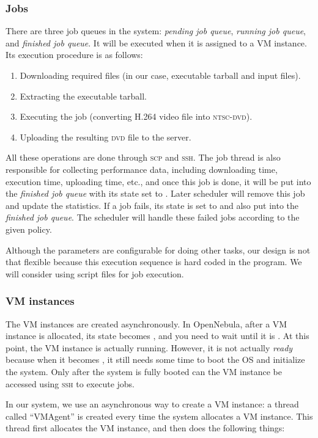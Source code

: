 \subsubsection{Jobs}
There are three job queues in the system: \emph{pending job queue},
\emph{running job queue}, and \emph{finished job queue}. It will be
executed when it is assigned to a VM instance. Its execution procedure
is as follows:

\begin{enumerate}
\item Downloading required files (in our case, executable tarball and
  input files).
\item Extracting the executable tarball.
\item Executing the job (converting H.264 video file into
  \textsc{ntsc-dvd}).
\item Uploading the resulting \textsc{dvd} file to the server.
\end{enumerate}

All these operations are done through \textsc{scp} and
\textsc{ssh}. The job thread is also responsible for collecting
performance data, including downloading time, execution time,
uploading time, etc., and once this job is done, it will be put into
the \emph{finished job queue} with its state set to
\statefinished. Later scheduler will remove this job and update the
statistics. If a job fails, its state is set to \statefailed and also put
into the \emph{finished job queue}. The scheduler will handle these
failed jobs according to the given policy.

Although the parameters are configurable for doing other tasks, our
design is not that flexible because this execution sequence is hard
coded in the program. We will consider using script files for job
execution.


\subsubsection{VM instances}
The VM instances are created asynchronously. In OpenNebula, after a VM
instance is allocated, its state becomes \statepending, and you need
to wait until it is \staterunning. At this point, the VM instance is
actually running. However, it is not actually \emph{ready} because
when it becomes \staterunning, it still needs some time to boot the OS and
initialize the system. Only after the system is fully booted can the
VM instance be accessed using \textsc{ssh} to execute jobs.

In our system, we use an asynchronous way to create a VM instance: a
thread called ``VMAgent'' is created every time the system allocates a
VM instance. This thread first allocates the VM instance, and then
does the following things:

